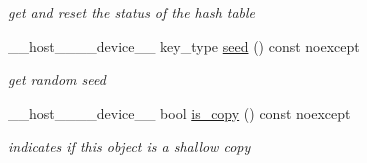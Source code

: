\begin{DoxyCompactItemize}
\begin{DoxyCompactList}\small\item\em get and reset the status of the hash table \end{DoxyCompactList}\item 
\+\_\+\+\_\+host\+\_\+\+\_\+\+\_\+\+\_\+device\+\_\+\+\_\+ key\+\_\+type \hyperlink{classwarpcore_1_1SingleValueHashTable_a28ba5f6952bad405f7d005cd5867e973}{seed} () const noexcept
\begin{DoxyCompactList}\small\item\em get random seed \end{DoxyCompactList}\item 
\+\_\+\+\_\+host\+\_\+\+\_\+\+\_\+\+\_\+device\+\_\+\+\_\+ bool \hyperlink{classwarpcore_1_1SingleValueHashTable_ad27e3e8fab3e2725d8437e4252566768}{is\+\_\+copy} () const noexcept
\begin{DoxyCompactList}\small\item\em indicates if this object is a shallow copy \end{DoxyCompactList}\end{DoxyCompactItemize}
